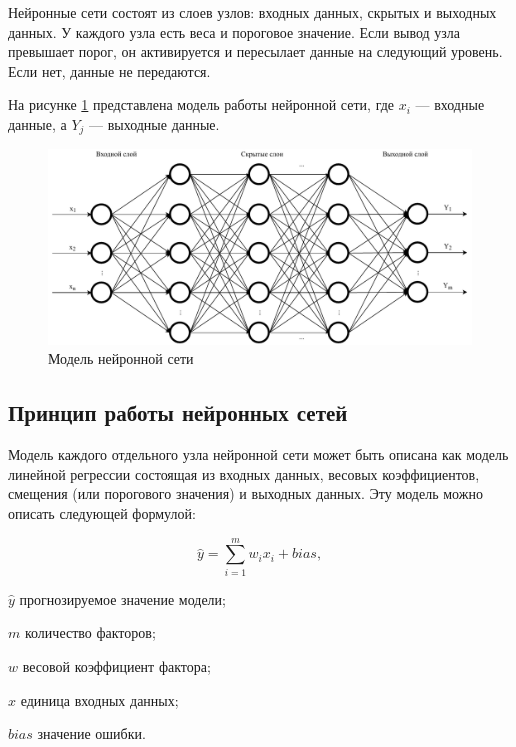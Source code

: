 Нейронные сети состоят из слоев узлов: входных данных, скрытых и выходных данных. 
У каждого узла есть веса и пороговое значение. Если вывод узла превышает порог, он активируется и 
пересылает данные на следующий уровень. Если нет, данные не передаются.

На рисунке \ref{fig:neuralnet} представлена модель работы нейронной сети, где $x_i$ --- входные данные, а $Y_j$ --- выходные данные.

\begin{figure}[H]
	\centering
	\includegraphics[width=\textwidth]{../img/neuralnet.pdf}
	\caption{Модель нейронной сети}
	\label{fig:neuralnet}
\end{figure}

\subsection{Принцип работы нейронных сетей}

Модель каждого отдельного узла нейронной сети может быть описана
как модель линейной регрессии \cite{linearreg} состоящая из входных данных, весовых коэффициентов, смещения (или порогового значения) и выходных данных.
Эту модель можно описать следующей формулой:

\begin{equation}
	\label{eq:nn0}
	\hat{y} = \sum_{i=1}^{m}w_ix_i + bias,
\end{equation}

\begin{eqexpl}[15mm]
\item{$\hat{y}$} прогнозируемое значение модели;
\item{$m$} количество факторов;
\item{$w$} весовой коэффициент фактора;
\item{$x$} единица входных данных;
\item{$bias$} значение ошибки.
\end{eqexpl}

